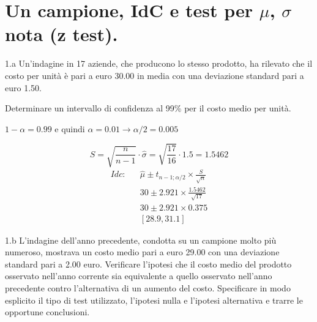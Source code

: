 \documentclass[
  11pt,
]{book}
\theoremstyle{mytheoremstyle}
\theoremstyle{mydefstyle}
\newenvironment{sol}
  {
  \begin{tcolorbox}[enhanced,breakable,arc=0.1mm,boxrule=1pt,colback=white,colframe=iblue,
  title=\bf \fontfamily{lmss}\selectfont \hspace{.5 cm} Soluzione,drop fuzzy shadow]

}{
\end{tcolorbox}
  }
\begin{document}
\section{\texorpdfstring{Un campione, IdC e test per \(\mu\), \(\sigma\) nota (z test).}{Un campione, IdC e test per \textbackslash mu, \textbackslash sigma nota (z test).}}\label{un-campione-idc-e-test-per-mu-sigma-nota-z-test.}

1.a Un'indagine in 17 aziende, che producono lo stesso prodotto,
ha rilevato che il costo per unità è pari a euro 30.00
in media con una deviazione standard pari a euro 1.50.

Determinare un intervallo di confidenza al 99\%
per il costo medio per unità.

\begin{sol}
\(1-\alpha =0.99\) e quindi \(\alpha=0.01\rightarrow \alpha/2=0.005\)

\[
      S  =\sqrt{\frac {n}{n-1}}\cdot\hat\sigma =
     \sqrt{\frac { 17 }{ 16 }}\cdot 1.5 = 1.5462 
\]
\begin{eqnarray*}
  Idc: & &  \hat\mu \pm  t_{n-1;\alpha/2} \times \frac{S}{\sqrt{n}} \\
     & &  30 \pm  2.921 \times \frac{ 1.5462 }{\sqrt{ 17 }} \\
     & &  30 \pm  2.921 \times  0.375 \\
     & & [ 28.9 ,  31.1 ]
\end{eqnarray*}

\end{sol}

1.b L'indagine dell'anno precedente, condotta
su un campione molto più numeroso, mostrava un costo medio
pari a euro 29.00 con una deviazione standard pari a 2.00 euro.
Verificare l'ipotesi che il costo medio del prodotto osservato
nell'anno corrente sia equivalente a quello osservato nell'anno
precedente contro l'alternativa di un aumento del costo.
Specificare in modo esplicito il tipo di test utilizzato,
l'ipotesi nulla e l'ipotesi alternativa e trarre le opportune
conclusioni.
\end{document}
